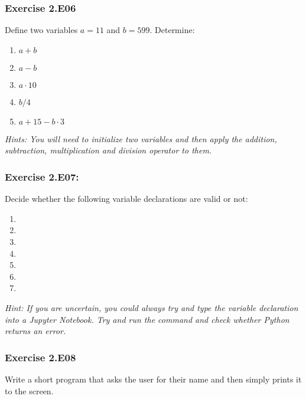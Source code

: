 \subsubsection*{Exercise 2.E06}
Define two variables $a = 11$ and $b = 599$. Determine:
\begin{enumerate}[label=(\alph*)]
	\item  $a + b$
	\item  $a - b$
	\item  $a \cdot 10$
	\item  $b / 4$
	\item  $a + 15 - b \cdot 3$
\end{enumerate}


\textit{Hints:
You will need to initialize two variables and then apply the addition, subtraction, multiplication and division operator to them.}\\[1cm]




\subsubsection*{Exercise 2.E07:}
Decide whether the following variable declarations are valid or not:

\begin{enumerate}[label=(\alph*)]
	\item {}
	\item {}
	\item {}
	\item {}
	\item {}
	\item {}
	\item {}
\end{enumerate}


\textit{Hint:
If you are uncertain, you could always try and type the variable declaration into a Jupyter Notebook. Try and run the command and check whether Python returns an error.}\\[1cm]




\subsubsection*{Exercise 2.E08}
Write a short program that asks the user for their name and then simply prints it to the screen.\\


